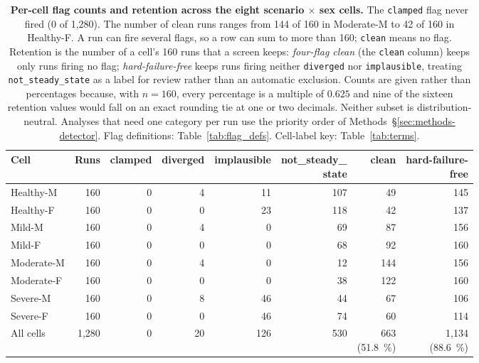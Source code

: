 \documentclass[pdflatex,sn-nature]{sn-jnl}%
\begin{document}
\begin{table}[h]
\centering
\caption{\textbf{Per-cell flag counts and retention across the eight scenario $\times$ sex cells.} The \texttt{clamped} flag never fired (0 of 1{,}280). The number of clean runs ranges from 144 of 160 in Moderate-M to 42 of 160 in Healthy-F. A run can fire several flags, so a row can sum to more than 160; \texttt{clean} means no flag. Retention is the number of a cell's 160 runs that a screen keeps: \emph{four-flag clean} (the \texttt{clean} column) keeps only runs firing no flag; \emph{hard-failure-free} keeps runs firing neither \texttt{diverged} nor \texttt{implausible}, treating \texttt{not\_steady\_state} as a label for review rather than an automatic exclusion. Counts are given rather than percentages because, with $n = 160$, every percentage is a multiple of $0.625$ and nine of the sixteen retention values would fall on an exact rounding tie at one or two decimals. Neither subset is distribution-neutral. Analyses that need one category per run use the priority order of Methods~\S\ref{sec:methods-detector}. Flag definitions: Table~\ref{tab:flag_defs}. Cell-label key: Table~\ref{tab:terms}.}
\label{tab:flag_summary}
\setlength{\tabcolsep}{4pt}
\begin{tabular}{lrrrrrrr}
\toprule
Cell & Runs & clamped & diverged & implausible & \shortstack[r]{not\_steady\_\\state} & clean & \shortstack[r]{hard-failure-\\free} \\
\midrule
Healthy-M & 160 & 0 & 4 & 11 & 107 & 49 & 145 \\
Healthy-F & 160 & 0 & 0 & 23 & 118 & 42 & 137 \\
\midrule
Mild-M & 160 & 0 & 4 & 0  & 69  & 87 & 156 \\
Mild-F & 160 & 0 & 0 & 0  & 68  & 92 & 160 \\
\midrule
Moderate-M & 160 & 0 & 4 & 0  & 12  & 144 & 156 \\
Moderate-F & 160 & 0 & 0 & 0  & 38  & 122 & 160 \\
\midrule
Severe-M & 160 & 0 & 8 & 46 & 44  & 67 & 106 \\
Severe-F & 160 & 0 & 0 & 46 & 74  & 60 & 114 \\
\midrule
All cells & 1{,}280 & 0 & 20 & 126 & 530 & \shortstack[r]{663\\(51.8~\%)} & \shortstack[r]{1{,}134\\(88.6~\%)} \\
\bottomrule
\end{tabular}
\end{table}
\end{document}

